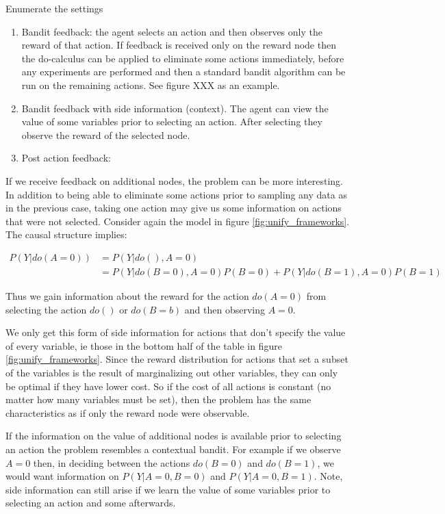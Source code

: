\documentclass[11pt,a4paper,oneside]{book}
\newcommand{\eqn}[1]{\begin{align}#1\end{align}}
\begin{document}
Enumerate the settings
\begin{enumerate}
\item Bandit feedback: the agent selects an action and then observes only the reward of that action. If feedback is received only on the reward node then the do-calculus can be applied to eliminate some actions immediately, before any experiments are performed and then a standard bandit algorithm can be run on the remaining actions. See figure XXX as an example. 
\item Bandit feedback with side information (context). The agent can view the value of some variables prior to selecting an action. After selecting they observe the reward of the selected node. 
\item Post action feedback:
\end{enumerate}

If we receive feedback on additional nodes, the problem can be more interesting. In addition to being able to eliminate some actions prior to sampling any data as in the previous case, taking one action may give us some information on actions that were not selected. Consider again the model in figure \ref{fig:unify_frameworks}. The causal structure implies: 

\eqn {
P(Y|do(A = 0)) &= P(Y|do(),A = 0) \\
&= P(Y|do(B=0),A=0)P(B=0)+P(Y|do(B=1),A=0)P(B=1) 
}

Thus we gain information about the reward for the action $do(A=0)$ from selecting the action $do()$ or $do(B = b)$ and then observing $A = 0$.  

We only get this form of side information for actions that don't specify the value of every variable, ie those in the bottom half of the table in figure \ref{fig:unify_frameworks}. Since the reward distribution for actions that set a subset of the variables is the result of marginalizing out other variables, they can only be optimal if they have lower cost. So if the cost of all actions is constant (no matter how many variables must be set), then the problem has the same characteristics as if only the reward node were observable.

If the information on the value of additional nodes is available prior to selecting an action the problem resembles a contextual bandit. For example if we observe $A = 0$ then, in deciding between the actions $do(B=0)$ and $do(B=1)$, we would want information on $P(Y|A=0,B=0)$ and $P(Y|A=0,B=1)$.  Note, side information can still arise if we learn the value of some variables prior to selecting an action and some afterwards. 
\end{document}
